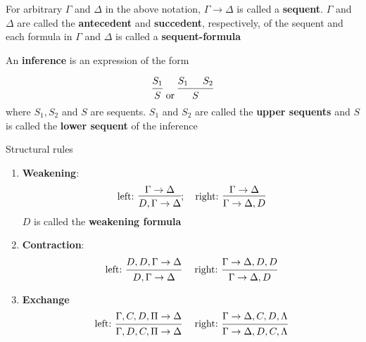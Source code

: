 \documentclass[11pt]{article}
\begin{document}
\begin{definition}[]
For arbitrary \(\Gamma\) and \(\Delta\) in the above notation, \(\Gamma\to\Delta\) is called a
\textbf{sequent}. \(\Gamma\) and \(\Delta\) are called the \textbf{antecedent} and \textbf{succedent},
respectively, of the sequent and each formula in \(\Gamma\) and \(\Delta\) is called a
\textbf{sequent-formula} 
\end{definition}

\begin{definition}[]
\label{def2.1}
An \textbf{inference} is an expression of the form

\begin{equation*}
\begin{prooftree}[center=false]
\hypo{S_1}
\infer1{S}
\end{prooftree}\text{ or }
\begin{prooftree}[center=false]
\hypo{S_1}
\hypo{S_2}
\infer2{S}
\end{prooftree}
\end{equation*}
where \(S_1,S_2\) and \(S\) are sequents. \(S_1\) and \(S_2\) are called the
\textbf{upper sequents} and \(S\) is called the \textbf{lower sequent} of the inference

Structural rules
\begin{enumerate}
\item \textbf{Weakening}:
\begin{equation*}
\text{left: }
\begin{prooftree}
\hypo{\Gamma\to\Delta}
\infer1{D,\Gamma\to\Delta}
\end{prooftree};\quad\text{right: }
\begin{prooftree}
\hypo{\Gamma\to\Delta}
\infer1{\Gamma\to\Delta,D}
\end{prooftree}
\end{equation*}
\(D\) is called the \textbf{weakening formula}
\item \textbf{Contraction}:
\begin{equation*}
\text{left: }
\begin{prooftree}
\hypo{D,D,\Gamma\to\Delta}
\infer1{D,\Gamma\to\Delta}
\end{prooftree}\quad\text{ right: }
\begin{prooftree}
\hypo{\Gamma\to\Delta,D,D}
\infer1{\Gamma\to\Delta,D}
\end{prooftree}
\end{equation*}
\item \textbf{Exchange}
\begin{equation*}
\text{left: }
\begin{prooftree}
\hypo{\Gamma,C,D,\Pi\to\Delta}
\infer1{\Gamma,D,C,\Pi\to\Delta}
\end{prooftree}\quad\text{ right: }
\begin{prooftree}
\hypo{\Gamma\to\Delta,C,D,\Lambda}
\infer1{\Gamma\to\Delta,D,C,\Lambda}
\end{prooftree}
\end{equation*}
\end{enumerate}



\end{definition}
\end{document}
